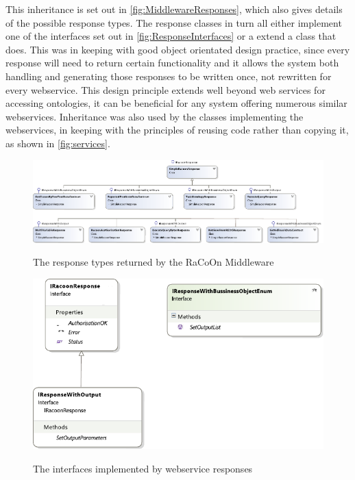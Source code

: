 This inheritance is set out in \autoref{fig:MiddlewareResponses}, which also gives details of the possible response types. The response classes in turn all either implement one of the interfaces set out in \autoref{fig:ResponseInterfaces} or a extend a class that does. This was in keeping with good object orientated design practice, since every response will need to return certain functionality and it allows the system both handling and generating those responses to be written once, not rewritten for every webservice. This design principle extends well beyond web services for accessing ontologies, it can be beneficial for any system offering numerous similar webservices. Inheritance was also used by the classes implementing the webservices, in keeping with the principles of reusing code rather than copying it, as shown in \autoref{fig:services}.

 \begin{figure}
\myfloatalign
{\includegraphics[width=\linewidth]{gfx/MiddlewareServicesClassesResponseOnly}} 
\caption{The response types returned by the RaCoOn Middleware}
\label{fig:MiddlewareResponses}
\end{figure}

 \begin{figure}
\myfloatalign
{\includegraphics[width=\linewidth]{gfx/Res}} 
\caption{The interfaces implemented by webservice responses}
\label{fig:ResponseInterfaces}
\end{figure}

